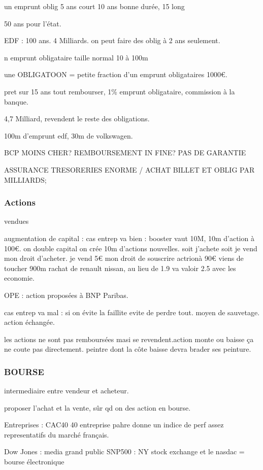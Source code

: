 \documentclass[a4paper,12pt]{article}
\begin{document}
un emprunt oblig 5 ans court
10 ans bonne durée, 15 long

50 ans pour l'état.

EDF : 100 ans. 4 Milliards.
on peut faire des oblig à 2 ans seulement.

n emprunt obligataire taille normal 10 à 100m

une OBLIGATOON = petite fraction d'un emprunt obligataires  1000€.

pret sur 15 ans tout rembourser, 1\% emprunt obligataire, commission à la banque.


4,7 Milliard, revendent le reste des obligations.

100m d'emprunt edf, 30m de volkswagen.

BCP MOINS CHER? REMBOURSEMENT IN FINE? PAS DE GARANTIE

ASSURANCE TRESORERIES ENORME / ACHAT BILLET ET OBLIG PAR MILLIARDS;



\subsubsection{Actions}
vendues 

augmentation de capital : cas entrep va bien : booster
vaut 10M, 10m d'action à 100€. on double capital on crée 10m d'actions nouvelles.
soit j'achete soit je vend mon droit d'acheter. je vend 5€ mon droit de souscrire actrionà 90€
viens de toucher 900m rachat de renault nissan, au lieu de 1.9 va valoir 2.5 avec les economie.

OPE : action proposées à BNP Paribas.


cas entrep va mal : si on évite la faillite evite de perdre tout. moyen de sauvetage.
action échangée.


les actions ne sont pas remboursées masi se revendent.action monte ou baisse ça ne coute pas directement.
peintre dont la côte baisse devra brader ses peinture.

\subsubsection{BOURSE}
intermediaire entre vendeur et acheteur.

proposer l'achat et la vente, sûr qd on des action en bourse.

Entreprises : CAC40 40 entreprise pahre  donne un indice de perf assez representatifs du marché français.

Dow Jones : media grand public
SNP500 : 
NY stock exchange et le nasdac = bourse électronique
\end{document}
